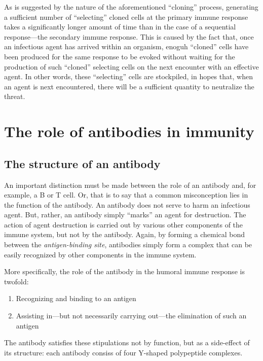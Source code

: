 \documentclass{article}
\begin{document}
As is suggested by the nature of the aforementioned ``cloning'' process,
generating a sufficient number of ``selecting'' cloned cells at the primary
immune response takes a significantly longer amount of time than in the case
of a sequential response---the secondary immune response. This is caused by
the fact that, once an infectious agent has arrived within an organism, enoguh
``cloned'' cells have been produced for the same response to be evoked without
waiting for the production of such ``cloned'' selecting cells on the next
encounter with an effective agent. In other words, these ``selecting'' cells
are stockpiled, in hopes that, when an agent is next encountered, there will be
a sufficient quantity to neutralize the threat.

\section{The role of antibodies in immunity}

\subsection{The structure of an antibody}

An important distinction must be made between the role of an antibody and, for
example, a B or T cell. Or, that is to say that a common misconception lies in
the function of the antibody. An antibody does not serve to harm an infectious
agent. But, rather, an antibody simply ``marks'' an agent for destruction. The
action of agent destruction is carried out by various other components of the
immune system, but not by the antibody. Again, by forming a chemical bond
between the \emph{antigen-binding site}, antibodies simply form a complex that
can be easily recognized by other components in the immune system.

More specifically, the role of the antibody in the humoral immune response is
twofold:

\begin{enumerate}
	\item Recognizing and binding to an antigen
	\item Assisting in---but not necessarily carrying out---the elimination of
		such an antigen
\end{enumerate}

The antibody satisfies these stipulations not by function, but as a side-effect
of its structure: each antibody consiss of four Y-shaped polypeptide complexes.
\end{document}
